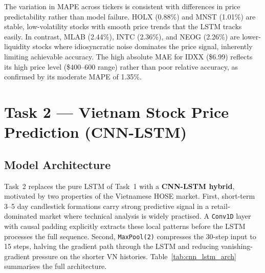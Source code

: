 \documentclass[12pt, a4paper]{article}
\begin{document}
The variation in MAPE across tickers is consistent with differences in
price predictability rather than model failure. HOLX (0.88\%) and MNST
(1.01\%) are stable, low-volatility stocks with smooth price trends that
the LSTM tracks easily. In contrast, MLAB (2.44\%), INTC (2.36\%), and
NEOG (2.26\%) are lower-liquidity stocks where idiosyncratic noise dominates
the price signal, inherently limiting achievable accuracy. The high absolute
MAE for IDXX (\$6.99) reflects its high price level (\$400--600 range) rather
than poor relative accuracy, as confirmed by its moderate MAPE of 1.35\%.






\section{Task 2 --- Vietnam Stock Price Prediction (CNN-LSTM)}

\subsection{Model Architecture}

Task~2 replaces the pure LSTM of Task~1 with a \textbf{CNN-LSTM hybrid},
motivated by two properties of the Vietnamese HOSE market. First,
short-term 3--5 day candlestick formations carry strong predictive signal
in a retail-dominated market where technical analysis is widely practised.
A \texttt{Conv1D} layer with causal padding explicitly extracts these local
patterns before the LSTM processes the full sequence. Second, \texttt{MaxPool(2)}
compresses the 30-step input to 15 steps, halving the gradient path through
the LSTM and reducing vanishing-gradient pressure on the shorter VN histories.
Table~\ref{tab:cnn_lstm_arch} summarises the full architecture.
\end{document}
